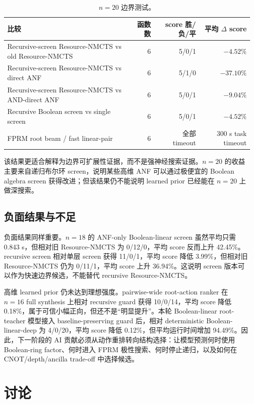 \documentclass[UTF8,fontset=macnew,11pt]{ctexart}
\newcommand{\method}{Resource-NMCTS}
\begin{document}
\begin{table}[t]
\centering
\small
\caption{$n=20$ 边界测试。}
\label{tab:n20}
\begin{tabularx}{\linewidth}{>{\raggedright\arraybackslash}Xrrr}
\toprule
比较 & 函数数 & score 胜/负/平 & 平均 $\Delta$ score \\
\midrule
Recursive-screen \method{} vs old \method{} & 6 & 5/0/1 & $-4.52\%$ \\
Recursive-screen \method{} vs direct ANF & 6 & 5/1/0 & $-37.10\%$ \\
Recursive-screen \method{} vs AND-direct ANF & 6 & 5/0/1 & $-9.04\%$ \\
Recursive Boolean screen vs single screen & 6 & 5/0/1 & $-4.52\%$ \\
FPRM root beam / fast linear-pair & 6 & 全部 timeout & 300 s task timeout \\
\bottomrule
\end{tabularx}
\end{table}

该结果更适合解释为边界可扩展性证据，而不是强神经搜索证据。$n=20$ 的收益主要来自递归布尔环 screen，说明某些高维 ANF 可以通过极便宜的 Boolean algebra screen 获得改进；但该结果仍不能说明 learned prior 已经能在 $n=20$ 上做深搜索。

\subsection{负面结果与不足}

负面结果同样重要。$n=18$ 的 ANF-only Boolean-linear screen 虽然平均只需 0.843 s，但相对旧 \method{} 为 0/12/0，平均 score 反而上升 42.45\%。recursive screen 相对单层 screen 获得 11/0/1，平均 score 降低 3.99\%，但相对旧 \method{} 仍为 0/11/1，平均 score 上升 36.94\%。这说明 screen 版本可以作为快速边界候选，不能替代 recursive Resource-NMCTS。

高维 learned prior 仍未达到理想强度。pairwise-wide root-action ranker 在 $n=16$ full synthesis 上相对 recursive guard 获得 10/0/14，平均 score 降低 0.18\%，属于可信小幅正向，但还不是“明显提升”。本轮 Boolean-linear root-teacher 模型接入 baseline-preserving guard 后，相对 deterministic Boolean-linear-deep 为 4/0/20，平均 score 降低 0.12\%，但平均运行时间增加 94.49\%。因此，下一阶段的 AI 贡献必须从动作重排转向结构选择：让模型预测何时使用 Boolean-ring factor、何时进入 FPRM 极性搜索、何时停止递归，以及如何在 CNOT/depth/ancilla trade-off 中选择候选。

\section{讨论}
\end{document}
